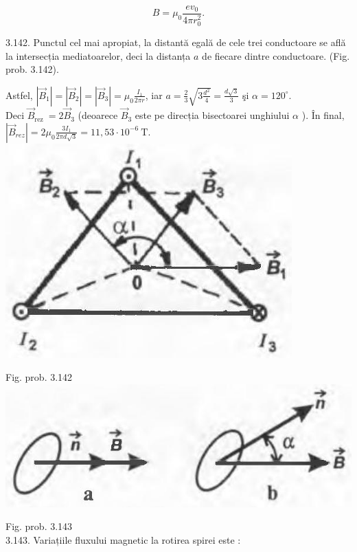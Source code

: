 \documentclass[10pt]{article}
\begin{document}
$$
B=\mu_{0} \frac{e v_{0}}{4 \pi r_{0}^{2}} .
$$

3.142. Punctul cel mai apropiat, la distantă egală de cele trei conductoare se află la intersecția mediatoarelor, deci la distanța $a$ de fiecare dintre conductoare. (Fig. prob. 3.142).

Astfel, $\left|\vec{B}_{1}\right|=\left|\vec{B}_{2}\right|=\left|\vec{B}_{3}\right|=\mu_{0} \frac{I_{1}}{2 \pi r}$, iar $a=\frac{2}{3} \sqrt{3 \frac{d^{2}}{4}}=\frac{d \sqrt{3}}{3}$ şi $\alpha=120^{\circ}$.\\
Deci $\vec{B}_{\text {rez }}=2 \vec{B}_{3}$ (deoarece $\vec{B}_{3}$ este pe direcția bisectoarei unghiului $\alpha$ ). În final, $\left|\vec{B}_{r e z}\right|=2 \mu_{0} \frac{3 I_{1}}{2 \pi d \sqrt{3}}=11,53 \cdot 10^{-6} \mathrm{~T}$.\\
\includegraphics[max width=\textwidth, center]{2025_07_01_5b3ff9fa0d508c8e9f17g-369}

Fig. prob. 3.142\\
\includegraphics[max width=\textwidth, center]{2025_07_01_5b3ff9fa0d508c8e9f17g-369(1)}

Fig. prob. 3.143\\
3.143. Variațiile fluxului magnetic la rotirea spirei este :
\end{document}

